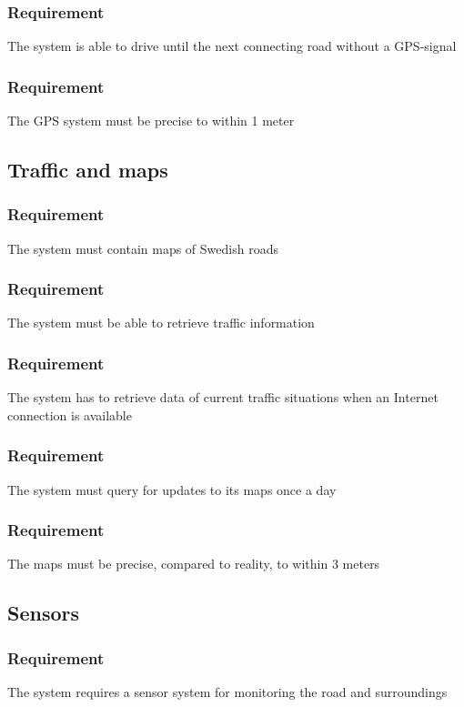\documentclass{article}
\begin{document}
{      \subsubsection{Requirement}
\hfill \break 
\- \- \-The system is able to drive until the next connecting road without a GPS-signal
      \subsubsection{Requirement}
\hfill \break 
\- \- \-The GPS system must be precise to within 1 meter
  \subsection{Traffic and maps}
      \subsubsection{Requirement}
\hfill \break 
\- \- \-The system must contain maps of Swedish roads
      \subsubsection{Requirement}
\hfill \break 
\- \- \-The system must be able to retrieve traffic information
      \subsubsection{Requirement}
\hfill \break 
\- \- \-The system has to retrieve data of current traffic situations when an Internet connection is available
      \subsubsection{Requirement}
\hfill \break 
\- \- \-The system must query for updates to its maps once a day
      \subsubsection{Requirement}
\hfill \break 
\- \- \-The maps must be precise, compared to reality, to within 3 meters
  \subsection{Sensors}
      \subsubsection{Requirement}
\hfill \break 
\- \- \-The system requires a sensor system for monitoring the road and surroundings
}
\end{document}
